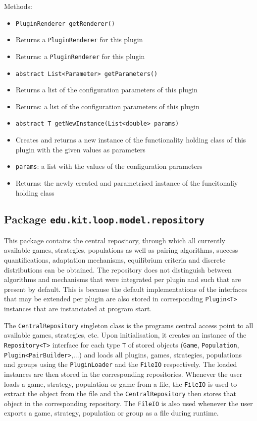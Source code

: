 \documentclass[parskip=full,11pt]{scrartcl}
\begin{document}
Methods:
\begin{itemize}\itemsep -10pt
	\item \texttt{PluginRenderer getRenderer()}
	\item[] Returns a \texttt{PluginRenderer} for this plugin
	\item[] Returns: a \texttt{PluginRenderer} for this plugin

	\item \texttt{abstract List<Parameter> getParameters()}
	\item[] Returns a list of the configuration parameters of this plugin
	\item[] Returns: a list of the configuration parameters of this plugin

	\item \texttt{abstract T getNewInstance(List<double> params)}
	\item[] Creates and returns a new instance of the functionality holding class of this plugin with the given values as parameters
	\item[] \texttt{params}: a list with the values of the configuration parameters
	\item[] Returns: the newly created and parametrised instance of the funcitonaliy holding class
\end{itemize}

\subsection{Package \texttt{edu.kit.loop.model.repository}}

This package contains the central repository, through which all currently available games, strategies, populations as well as pairing algorithms, success quantifications, adaptation mechanisms, equilibrium criteria and discrete distributions can be obtained. The repository does not distinguish between algorithms and mechanisms that were integrated per plugin and such that are present by default. This is because the default implementations of the interfaces that may be extended per plugin are also stored in corresponding \texttt{Plugin<T>} instances that are instanciated at program start.

The \texttt{CentralRepository} singleton class is the programs central access point to all available games, strategies, etc. Upon initialisation, it creates an instance of the \texttt{Repository<T>} interface for each type \texttt{T} of stored objects (\texttt{Game}, \texttt{Population}, \texttt{Plugin<PairBuilder>},...) and loads all plugins, games, strategies, populations and groups using the \texttt{PluginLoader} and the \texttt{FileIO} respectively. The loaded instances are then stored in the corresponding repositories. Whenever the user loads a game, strategy, population or game from a file, the \texttt{FileIO} is used to extract the object from the file and the \texttt{CentralRepository} then stores that object in the corresponding repository. The \texttt{FileIO} is also used whenever the user exports a game, strategy, population or group as a file during runtime.
\end{document}
